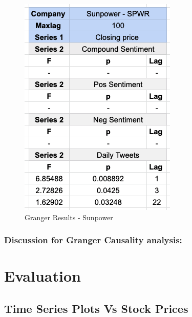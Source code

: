 \documentclass[sigconf, nonacm]{acmart}
\begin{document}
\begin{figure}[H]
  \centering
  \includegraphics[width=0.7\linewidth]{granger_results/granger_sunpower.png}
  \caption{Granger Results - Sunpower}
  \label{granger_sunpower}
\end{figure}


\subsubsection{Discussion for Granger Causality analysis:}



\section{Evaluation}
\subsection{Time Series Plots Vs Stock Prices} 

\end{document}

